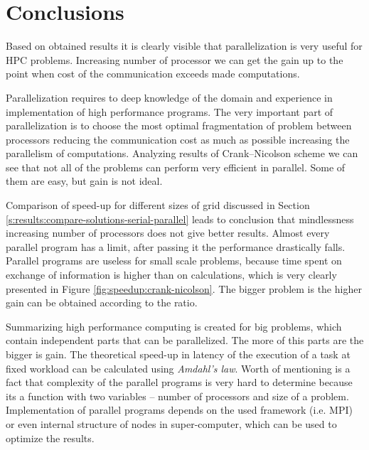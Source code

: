 \chapter{Conclusions} \label{chp:summary}
	Based on obtained results it is clearly visible that parallelization is very useful for \gls{HPC} problems. Increasing number of processor we can get the gain up to the point when cost of the communication exceeds made computations. 
	
	Parallelization requires to deep knowledge of the domain and experience in implementation of high performance programs. The very important part of parallelization is to choose the most optimal fragmentation of problem between processors reducing the communication cost as much as possible increasing the parallelism of computations. Analyzing results of Crank--Nicolson scheme we can see that not all of the problems can perform very efficient in parallel. Some of them are easy, but gain is not ideal. 
	
	Comparison of \gls{speed-up} for different sizes of grid discussed in Section \ref{s:results:compare-solutions-serial-parallel} leads to conclusion that mindlessness increasing number of processors does not give better results. Almost every parallel program has a limit, after passing it the performance drastically falls. Parallel programs are useless for small scale problems, because time spent on exchange of information is higher than on calculations, which is very clearly presented in Figure \ref{fig:speedup:crank-nicolson}. The bigger problem is the higher gain can be obtained according to the  ratio.
	
	Summarizing high performance computing is created for big problems, which contain independent parts that can be parallelized. The more of this parts are the bigger is gain. The theoretical 
	\gls{speed-up} in latency of the execution of a task at fixed workload can be calculated using \emph{Amdahl's law}. Worth of mentioning is a fact that complexity of the parallel programs is very hard to determine because its a function with two variables -- number of processors and size of a problem. Implementation of parallel programs depends on the used framework (i.e. \gls{MPI}) or even internal structure of nodes in \gls{super-computer}, which can be used to optimize the results.